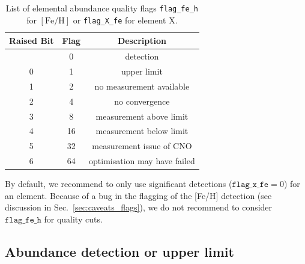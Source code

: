 \documentclass[
  journal=pasa,
  manuscript=research-paper, %
  year=2024,
  volume=37
]{cup-journal}
\newcommand{\feh}{$\mathrm{[Fe/H]}$\xspace}
\begin{document}
\begin{table}
\centering
\caption{List of elemental abundance quality flags \texttt{flag\_fe\_h} for \feh or \texttt{flag\_X\_fe} for element X.}
\label{tab:flag_x_fe}
\begin{tabular}{ccc}
\hline \hline
Raised Bit & Flag & Description \\
\hline
  & 0 & detection \\ 
0 & 1 & upper limit \\ 
1 & 2 & no measurement available\\
2 & 4 & no convergence\\
3 & 8 & measurement above limit\\
4 & 16 & measurement below limit\\
5 & 32 & measurement issue of CNO \\
6 & 64 & optimisation may have failed \\
\hline
\end{tabular}
\end{table}

By default, we recommend to only use significant detections ($\texttt{flag\_x\_fe} = 0$) for an element. Because of a bug in the flagging of the [Fe/H] detection (see discussion in Sec.~\ref{sec:caveats_flags}), we do not recommend to consider $\texttt{flag\_fe\_h}$ for quality cuts.

\subsection{Abundance detection or upper limit}
\label{sec:abundance_detection_or_upper_limit}
\end{document}
